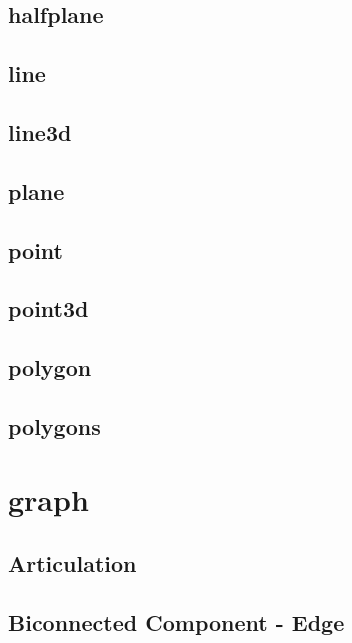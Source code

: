 \documentclass[a4paper,5pt,twocolumn,titlepage]{article}
\begin{document}
\subsection{halfplane}

\subsection{line}

\subsection{line3d}

\subsection{plane}

\subsection{point}

\subsection{point3d}

\subsection{polygon}

\subsection{polygons}

\section{graph}
\subsection{Articulation}

\subsection{Biconnected Component - Edge}

\end{document}
